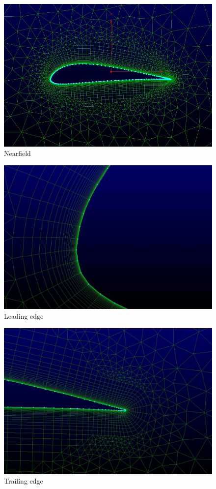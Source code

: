 \begin{enumerate}
\begin{figure}[ht]
	\centering
	\includegraphics[width=\textwidth]{general_images/nearfield}
	\caption{Nearfield}
\label{fig:nearfield}
\end{figure}	

\begin{figure}[ht]
	\centering
	\includegraphics[width=\textwidth]{general_images/LE1}
	\caption{Leading edge}
\label{fig:LE}
\end{figure}

\begin{figure}[ht]
	\centering
	\includegraphics[width=\textwidth]{general_images/TE1}
	\caption{Trailing edge}
\label{fig:TE}
\end{figure}
		
\end{enumerate}